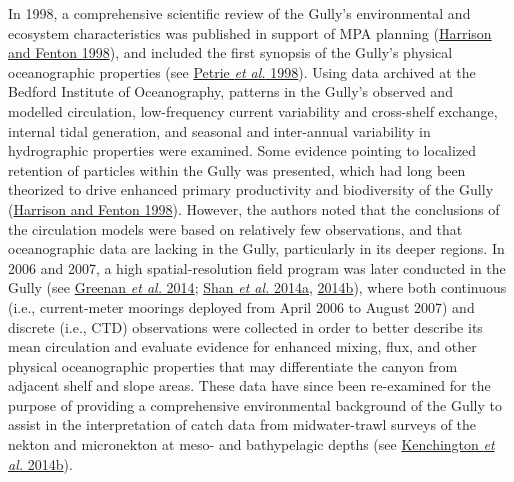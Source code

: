 \documentclass[12pt]{article}\usepackage[]{graphicx}\usepackage[]{color}
\begin{document}
In 1998, a comprehensive scientific review of the Gully's environmental and ecosystem characteristics was published in support of MPA planning (\protect\hyperlink{ref-harrison_1998}{Harrison and Fenton 1998}), and included the first synopsis of the Gully's physical oceanographic properties (see \protect\hyperlink{ref-petrie_1998}{Petrie \textit{et al.} 1998}). Using data archived at the Bedford Institute of Oceanography, patterns in the Gully's observed and modelled circulation, low-frequency current variability and cross-shelf exchange, internal tidal generation, and seasonal and inter-annual variability in hydrographic properties were examined. Some evidence pointing to localized retention of particles within the Gully was presented, which had long been theorized to drive enhanced primary productivity and biodiversity of the Gully (\protect\hyperlink{ref-harrison_1998}{Harrison and Fenton 1998}). However, the authors noted that the conclusions of the circulation models were based on relatively few observations, and that oceanographic data are lacking in the Gully, particularly in its deeper regions. In 2006 and 2007, a high spatial-resolution field program was later conducted in the Gully (see \protect\hyperlink{ref-greenan_2014}{Greenan \textit{et al.} 2014}; \protect\hyperlink{ref-shan_2014a}{Shan \textit{et al.} 2014a}, \protect\hyperlink{ref-shan_2014b}{2014b}), where both continuous (i.e., current-meter moorings deployed from April 2006 to August 2007) and discrete (i.e., CTD) observations were collected in order to better describe its mean circulation and evaluate evidence for enhanced mixing, flux, and other physical oceanographic properties that may differentiate the canyon from adjacent shelf and slope areas. These data have since been re-examined for the purpose of providing a comprehensive environmental background of the Gully to assist in the interpretation of catch data from midwater-trawl surveys of the nekton and micronekton at meso- and bathypelagic depths (see \protect\hyperlink{ref-kenchington_2014b}{Kenchington \textit{et al.} 2014b}).
\end{document}
